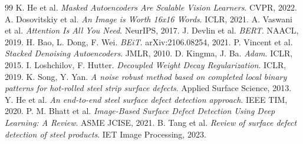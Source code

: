 \documentclass[twocolumn,10pt,a4paper]{article}
\begin{document}
\small
\begin{thebibliography}{99}
 K. He et al. \emph{Masked Autoencoders Are Scalable Vision Learners}. CVPR, 2022.
 A. Dosovitskiy et al. \emph{An Image is Worth 16x16 Words}. ICLR, 2021.
 A. Vaswani et al. \emph{Attention Is All You Need}. NeurIPS, 2017.
 J. Devlin et al. \emph{BERT}. NAACL, 2019.
 H. Bao, L. Dong, F. Wei. \emph{BEiT}. arXiv:2106.08254, 2021.
 P. Vincent et al. \emph{Stacked Denoising Autoencoders}. JMLR, 2010.
 D. Kingma, J. Ba. \emph{Adam}. ICLR, 2015.
 I. Loshchilov, F. Hutter. \emph{Decoupled Weight Decay Regularization}.
ICLR, 2019.
 K. Song, Y. Yan. \emph{A noise robust method based on completed local binary
patterns for hot-rolled steel strip surface defects}. Applied Surface Science, 2013.
 Y. He et al. \emph{An end-to-end steel surface defect detection approach}. IEEE TIM,
2020.
 P. M. Bhatt et al. \emph{Image-Based Surface Defect Detection Using Deep
Learning: A Review}. ASME JCISE, 2021.
 B. Tang et al. \emph{Review of surface defect detection of steel products}. IET
Image Processing, 2023.
\end{thebibliography}
\end{document}
